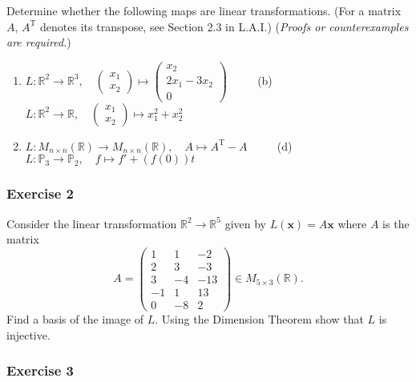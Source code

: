 \documentclass[
  12pt,
  a4paper,
  twoside]{article}
\theoremstyle{plain}
\theoremstyle{definition}
\begin{document}
Determine whether the following maps are linear transformations. (For a matrix
\(A\), \(A^\mathrm{T}\) denotes its transpose, see Section 2.3 in L.A.I.) (\emph{Proofs or
counterexamples are required.})

\begin{enumerate}
\def\labelenumi{(\alph{enumi})}
\item
  \(L: \mathbb{R}^2 \rightarrow \mathbb{R}^3, \quad \left(\begin{array}{c} x_1 \\ x_2 \end{array}\right) \mapsto \left(\begin{array}{c}x_2\\ 2x_1 - 3x_2 \\ 0\end{array}\right)\) \(\qquad\) (b) \(L: \mathbb{R}^2 \rightarrow \mathbb{R}, \quad \left(\begin{array}{c}x_1 \\ x_2 \end{array}\right) \mapsto x_1^2 + x_2^2\)
\item
  \(L: M_{n \times n}(\mathbb{R}) \rightarrow M_{n \times n}(\mathbb{R}), \quad A \mapsto A^\mathrm{T} - A\) \(\qquad\) (d) \(L: \mathbb{P}_3 \rightarrow \mathbb{P}_2, \quad f \mapsto f' + (f(0))t\)
\end{enumerate}

\hypertarget{exercise-2-6}{%
\subsubsection*{Exercise 2}\label{exercise-2-6}}

Consider the linear transformation \(\mathbb{R}^2 \rightarrow \mathbb{R}^5\)
given by \(L(\mathbf{x}) = A\mathbf{x}\) where \(A\) is the matrix
\[A=\left(\begin{array}{ccc} 1 & 1 & -2\\ 2 & 3 & -3 \\ 3& -4 & -13\\ -1 & 1 & 13 \\ 0 & -8 & 2 \end{array}\right) \in M_{5 \times 3}(\mathbb{R}).\]
Find a basis of the image of \(L\). Using the Dimension Theorem show that \(L\) is injective.

\hypertarget{exercise-3-6}{%
\subsubsection*{Exercise 3}\label{exercise-3-6}}
\end{document}
